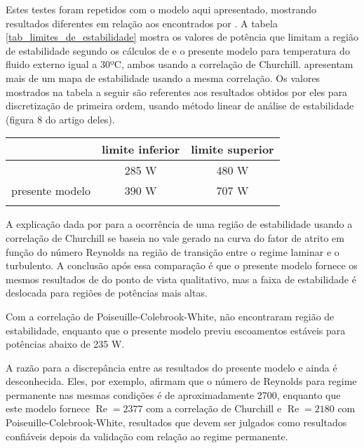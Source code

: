 \documentclass[a4paper,portuguese,10pt]{article}
\renewcommand{\Re}{\operatorname{Re}}
\begin{document}
Estes testes foram repetidos com o modelo aqui apresentado, mostrando resultados diferentes em relação aos encontrados por \citet{AMBROSINI04}. A tabela \ref{tab_limites_de_estabilidade} mostra os valores de potência que limitam a região de estabilidade segundo os cálculos de \citet{AMBROSINI04} e o presente modelo para temperatura do fluido externo igual a 30ºC, ambos usando a correlação de Churchill. \citet{AMBROSINI04} apresentam mais de um mapa de estabilidade usando a mesma correlação. Os valores mostrados na tabela a seguir são referentes aos resultados obtidos por eles para discretização de primeira ordem, usando método linear de análise de estabilidade (figura 8 do artigo deles).

\begin{center}
  \begin{tabular}{ccc}
    \hline
    & limite inferior & limite superior\\
    \hline
    \citet{AMBROSINI04} & 285 W & 480 W\\
    presente modelo & 390 W & 707 W\\
    \hline\\
  \end{tabular}
  \label{tab_limites_de_estabilidade}
\end{center}

A explicação dada por \citet{AMBROSINI04} para a ocorrência de uma região de estabilidade usando a correlação de Churchill se baseia no vale gerado na curva do fator de atrito em função do número Reynolds na região de transição entre o regime laminar e o turbulento. A conclusão após essa comparação é que o presente modelo fornece os mesmos resultados de \citet{AMBROSINI04} do ponto de vista qualitativo, mas a faixa de estabilidade é deslocada para regiões de potências mais altas.

Com a correlação de Poiseuille-Colebrook-White, \citet{AMBROSINI04} não encontraram região de estabilidade, enquanto que o presente modelo previu escoamentos estáveis para potências abaixo de 235 W. %

A razão para a discrepância entre as resultados do presente modelo e \citet{AMBROSINI04} ainda é desconhecida. Eles, por exemplo, afirmam que o número de Reynolds para regime permanente nas mesmas condições é de aproximadamente 2700, enquanto que este modelo fornece $\Re = 2377$ com a correlação de Churchill e $\Re = 2180$ com Poiseuille-Colebrook-White, resultados que devem ser julgados como resultados confiáveis depois da validação com relação ao regime permanente.
\end{document}
